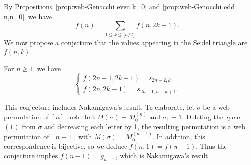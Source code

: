 By Propositions~\ref{prop:web-Genocchi even k=0} and \ref{prop:web-Genocchi odd n,n=0}, we have
\[
  f(n)=\sum_{1\le k \le \lfloor n/2 \rfloor}f(n,2k-1).
\]
We now propose a conjecture that the values appearing in the Seidel triangle are $f(n,k)$.
\begin{conj}[Verified up to \( n=6 \)] \label{conj:Seidel}
  For \( n\ge 1 \), we have
  \[
    \begin{cases}
      f(2n-1,2k-1)= s_{2n-2, k},\\
      f(2n, 2k-1) = s_{2n-1, n-k+1}.
    \end{cases}
  \]
\end{conj}
This conjecture includes Nakamigawa's result. To elaborate, let \( \sigma \) be a
web permutation of \( [n] \) such that \( M(\sigma)=M^{(n)}_0 \) and
\( \sigma_1 = 1 \). Deleting the cycle \( (1) \) from \( \sigma \) and decreasing
each letter by 1, the resulting permutation is a web permutation of
\( [n-1] \) with \( M(\sigma)=M^{(n-1)}_0 \).
In addition, this correspondence is bijective, so we deduce \( f(n,1) = f(n-1) \).
Thus the conjecture implies \( f(n-1) = g_{n-1} \), which is Nakamigawa's result.

